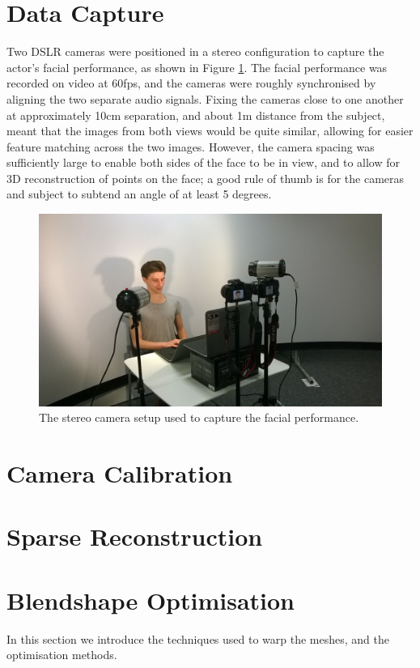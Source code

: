 \documentclass[11pt]{report}
\begin{document}
\section{Data Capture} \label{sec:datacapture}

Two DSLR cameras were positioned in a stereo configuration to capture the actor's facial performance, as shown in Figure \ref{fig:setup1}. The facial performance was recorded on video at 60fps, and the cameras were roughly synchronised by aligning the two separate audio signals. Fixing the cameras close to one another at approximately 10cm separation, and about 1m distance from the subject, meant that the images from both views would be quite similar, allowing for easier feature matching across the two images. However, the camera spacing was sufficiently large to enable both sides of the face to be in view, and to allow for 3D reconstruction of points on the face; a good rule of thumb is for the cameras and subject to subtend an angle of at least 5 degrees. 

\begin{figure}[htbp!]
\centering
\includegraphics[width=\textwidth]{img/setup1}
	\caption{The stereo camera setup used to capture the facial performance.}
	\label{fig:setup1}
\end{figure}

\section{Camera Calibration}

\section{Sparse Reconstruction}


\section{Blendshape Optimisation}
In this section we introduce the techniques used to warp the meshes, and the optimisation methods.
\end{document}
